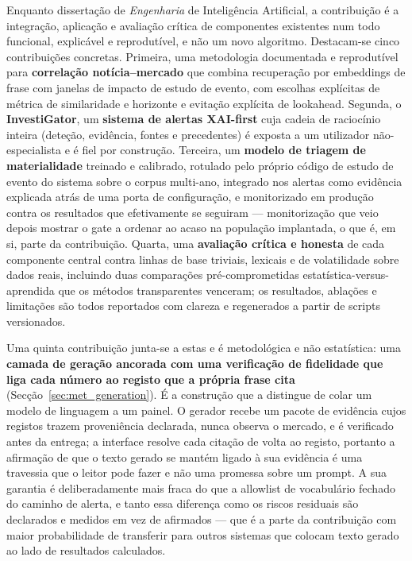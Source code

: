 Enquanto dissertação de \emph{Engenharia} de Inteligência Artificial, a contribuição é a integração,
aplicação e avaliação crítica de componentes existentes num todo funcional, explicável e reprodutível,
e não um novo algoritmo. Destacam-se cinco contribuições concretas. Primeira, uma metodologia
documentada e reprodutível para \textbf{correlação notícia--mercado} que combina recuperação por
embeddings de frase com janelas de impacto de estudo de evento, com escolhas explícitas de métrica de
similaridade e horizonte e evitação explícita de lookahead. Segunda, o \textbf{InvestiGator}, um
\textbf{sistema de alertas XAI-first} cuja cadeia de raciocínio inteira (deteção, evidência, fontes e
precedentes) é exposta a um utilizador não-especialista e é fiel por construção. Terceira, um
\textbf{modelo de triagem de materialidade} treinado e calibrado, rotulado pelo próprio código de
estudo de evento do sistema sobre o corpus multi-ano, integrado nos alertas como evidência explicada
atrás de uma porta de configuração, e monitorizado em produção contra os resultados que
efetivamente se seguiram --- monitorização que veio depois mostrar o gate a ordenar ao acaso na
população implantada, o que é, em si, parte da contribuição. Quarta, uma \textbf{avaliação crítica e honesta} de cada componente central
contra linhas de base triviais, lexicais e de volatilidade sobre dados reais, incluindo duas
comparações pré-comprometidas estatística-versus-aprendida que os métodos transparentes venceram; os
resultados, ablações e limitações são todos reportados com clareza e regenerados a partir de scripts
versionados.

Uma quinta contribuição junta-se a estas e é metodológica e não estatística: uma \textbf{camada de
geração ancorada com uma verificação de fidelidade que liga cada número ao registo que a própria
frase cita} (Secção~\ref{sec:met_generation}). É a construção que a distingue de colar um modelo de
linguagem a um painel. O gerador recebe um pacote de evidência cujos registos trazem proveniência
declarada, nunca observa o mercado, e é verificado antes da entrega; a interface resolve cada citação
de volta ao registo, portanto a afirmação de que o texto gerado se mantém ligado à sua evidência é
uma travessia que o leitor pode fazer e não uma promessa sobre um prompt. A sua garantia é
deliberadamente mais fraca do que a allowlist de vocabulário fechado do caminho de alerta, e tanto
essa diferença como os riscos residuais são declarados e medidos em vez de afirmados --- que é a
parte da contribuição com maior probabilidade de transferir para outros sistemas que colocam texto
gerado ao lado de resultados calculados.

